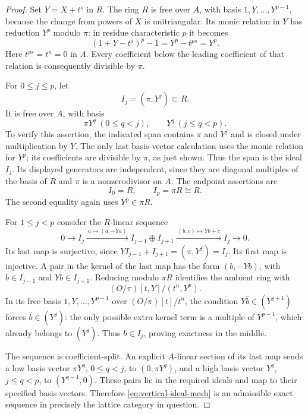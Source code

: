 \begin{proof}
Set $Y=X+t^s$ in $R$.  The ring $R$ is free over $A$, with basis
$1,Y,\ldots,Y^{p-1}$, because the change from powers of $X$ is
unitriangular.  Its monic relation in $Y$ has reduction $Y^p$
modulo $\pi$: in residue characteristic $p$ it becomes
\[
 (1+Y-t^s)^p-1=Y^p-t^{ps}=Y^p.
\]
Here $t^{ps}=t^n=0$ in $A$.  Every coefficient below the leading
coefficient of that relation is consequently divisible by $\pi$.

For $0\leq j\leq p$, let
\[
 I_j=(\pi,Y^j)\subset R.
\]
It is free over $A$, with basis
\begin{equation}\label{eq:vertical-ideal-bases}
 \pi Y^q\ (0\leq q<j),\qquad Y^q\ (j\leq q<p).
\end{equation}
To verify this assertion, the indicated span contains $\pi$ and
$Y^j$ and is closed under multiplication by $Y$.  The only last
basis-vector calculation uses the monic relation for $Y^p$; its
coefficients are divisible by $\pi$, as just shown.  Thus the span
is the ideal $I_j$.  Its displayed generators are independent,
since they are diagonal multiples of the basis of $R$ and $\pi$
is a nonzerodivisor on $A$.  The endpoint assertions are
\[
 I_0=R,\qquad I_p=\pi R\cong R.
\]
The second equality again uses $Y^p\in\pi R$.

For $1\leq j<p$ consider the $R$-linear sequence
\begin{equation}\label{eq:vertical-ideal-mesh}
 0\longrightarrow I_j
 \xrightarrow{\ a\mapsto(a,-Ya)\ }
 I_{j-1}\oplus I_{j+1}
 \xrightarrow{\ (b,c)\mapsto Yb+c\ }
 I_j\longrightarrow0.
\end{equation}
Its last map is surjective, since
$YI_{j-1}+I_{j+1}=(\pi,Y^j)=I_j$.
Its first map is injective.  A pair in the kernel of the last map
has the form $(b,-Yb)$, with $b\in I_{j-1}$ and
$Yb\in I_{j+1}$.  Reducing modulo $\pi R$ identifies the ambient
ring with
\[
 (O/\pi)[t,Y]/(t^n,Y^p).
\]
In its free basis $1,Y,\ldots,Y^{p-1}$ over
$(O/\pi)[t]/t^n$, the condition $Y\bar b\in(Y^{j+1})$
forces $\bar b\in(Y^j)$: the only possible extra kernel term
is a multiple of $Y^{p-1}$, which already belongs to $(Y^j)$.
Thus $b\in I_j$, proving exactness in the middle.

The sequence is coefficient-split.  An explicit $A$-linear
section of its last map sends a low basis vector
$\pi Y^q$, $0\leq q<j$, to $(0,\pi Y^q)$, and a high
basis vector $Y^q$, $j\leq q<p$, to $(Y^{q-1},0)$.
These pairs lie in the required ideals and map to their specified
basis vectors.  Therefore \eqref{eq:vertical-ideal-mesh} is an
admissible exact sequence in precisely the lattice category in
question.


\end{proof}
